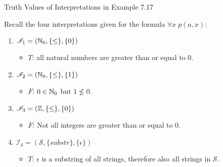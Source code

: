 \documentclass[style=sailor,size=12pt]{powerdot}
\begin{document}
\begin{wideslide}[bm=,toc=]{Truth Values of Interpretations in Example 7.17}
\begin{ex}{7.21}
Recall the four interpretations given for the formula $\forall x \; p(a,x)$:
\end{ex}
\vspace*{-2ex}
\begin{enumerate}
\item<2-> $\mathcal{I}_1 = (\mathbb{N}_0,\{\leq\},\{0\})$
\begin{itemize}
\item<3-> $T$: all natural numbers are greater than or equal to $0$.
\end{itemize}
\item<4-> $\mathcal{I}_2 = (\mathbb{N}_0,\{\leq\},\{1\})$
\begin{itemize}
\item<5-> $F$: $0 \in \mathbb{N}_0$ but $1 \not \leq 0$. 
\end{itemize}
\item<6-> $\mathcal{I}_3 = (\mathbb{Z},\{\leq\},\{0\})$
\begin{itemize}
\item<7-> $F$: Not all integers are greater than or equal to $0$.
\end{itemize}
\item<8-> $\mathcal{I}_4 = (\mathcal{S},\{substr\},\{ \epsilon \})$
\begin{itemize}
\item<9-> $T$: $\epsilon$ is a substring of all strings, therefore also all
strings in $\mathcal{S}$. 
\end{itemize}
\end{enumerate}
\end{wideslide}
\end{document}
